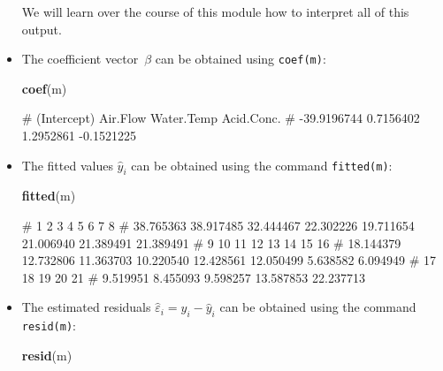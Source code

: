 \documentclass[
  a4paper,
]{article}
\newenvironment{Shaded}{\begin{snugshade}}{\end{snugshade}}
\newcommand{\FunctionTok}[1]{\textcolor[rgb]{0.13,0.29,0.53}{\textbf{#1}}}
\newcommand{\NormalTok}[1]{#1}
\theoremstyle{definition}
\theoremstyle{definition}
\theoremstyle{definition}
\theoremstyle{definition}
\theoremstyle{remark}
\begin{document}
\begin{itemize}
  We will learn over the course of this module how to interpret
  all of this output.
\item
  The coefficient vector~\(\beta\) can be obtained using
  \texttt{coef(m)}:

\begin{Shaded}
\begin{Highlighting}[]
  \FunctionTok{coef}\NormalTok{(m)}
\end{Highlighting}
\end{Shaded}

\begin{Shaded}
\begin{Highlighting}[]
\NormalTok{\# (Intercept)    Air.Flow  Water.Temp  Acid.Conc. }
\NormalTok{\# {-}39.9196744   0.7156402   1.2952861  {-}0.1521225}
\end{Highlighting}
\end{Shaded}
\item
  The fitted values \(\hat y_i\) can be obtained using
  the command \texttt{fitted(m)}:

\begin{Shaded}
\begin{Highlighting}[]
  \FunctionTok{fitted}\NormalTok{(m)}
\end{Highlighting}
\end{Shaded}

\begin{Shaded}
\begin{Highlighting}[]
\NormalTok{\#         1         2         3         4         5         6         7         8 }
\NormalTok{\# 38.765363 38.917485 32.444467 22.302226 19.711654 21.006940 21.389491 21.389491 }
\NormalTok{\#         9        10        11        12        13        14        15        16 }
\NormalTok{\# 18.144379 12.732806 11.363703 10.220540 12.428561 12.050499  5.638582  6.094949 }
\NormalTok{\#        17        18        19        20        21 }
\NormalTok{\#  9.519951  8.455093  9.598257 13.587853 22.237713}
\end{Highlighting}
\end{Shaded}
\item
  The estimated residuals \(\hat\varepsilon_i = y_i - \hat y_i\) can
  be obtained using the command \texttt{resid(m)}:

\begin{Shaded}
\begin{Highlighting}[]
  \FunctionTok{resid}\NormalTok{(m)}
\end{Highlighting}
\end{Shaded}


\end{itemize}
\end{document}
